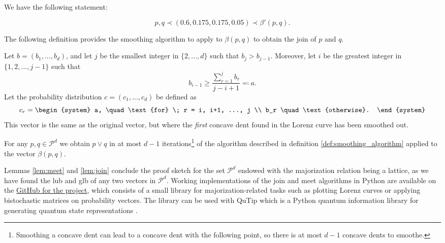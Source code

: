 \noindent We have the following statement:

\begin{equation}
    p, q \prec (0.6, 0.175, 0.175, 0.05) \prec \beta'(p, q).
\end{equation}

The following definition provides the smoothing algorithm to apply to $\beta(p, q)$ to obtain the join of $p$ and $q$.

\begin{definition} \label{def:smoothing_algorithm}
    Let $b = (b_1, ..., b_d)$, and let $j$ be the smallest integer in $\{2,...,d\}$ such that $b_j > b_{j-1}$. Moreover, let $i$ be the greatest integer in $\{1, 2, ..., j-1\}$ such that
    \begin{equation}
        b_{i-1} \geq \frac{\sum_{r=1}^{j}b_r}{j-i+1} \eqqcolon a.
    \end{equation}
    Let the probability distribution $c = (c_1, ..., c_d)$ be defined as
    \begin{equation}
        c_r = \begin{system}
                a, \quad \text{for} \; r = i, i+1, ..., j \\ %
                b_r \quad \text{otherwise}.
              \end{system}
    \end{equation}
    This vector is the same as the original vector, but where the \textit{first} concave dent found in the Lorenz curve has been smoothed out.
\end{definition}

\begin{lemma} \label{lem:join}
    For any $p, q \in \mathcal{P}^d$ we obtain $p \vee q$ in at most $d-1$ iterations\footnote{Smoothing a concave dent can lead to a concave dent with the following point, so there is at most $d-1$ concave dents to smoothe.} of the algorithm described in definition \ref{def:smoothing_algorithm} applied to the vector $\beta(p, q)$.
\end{lemma}

Lemmas \ref{lem:meet} and \ref{lem:join} conclude the proof sketch for the set $\mathcal{P}^d$ endowed with the majorization relation being a lattice, as we have found the lub and glb of any two vectors in $\mathcal{P}^d$. Working implementations of the join and meet algorithms in Python are available on the \href{https://github.com/traaldbjerg/MajoLat}{GitHub for the project}, which consists of a small library for majorization-related tasks such as plotting Lorenz curves or applying bistochastic matrices on probability vectors. The library can be used with QuTip which is a Python quantum information library for generating quantum state representations \cite{lambert_qutip_2024}.


